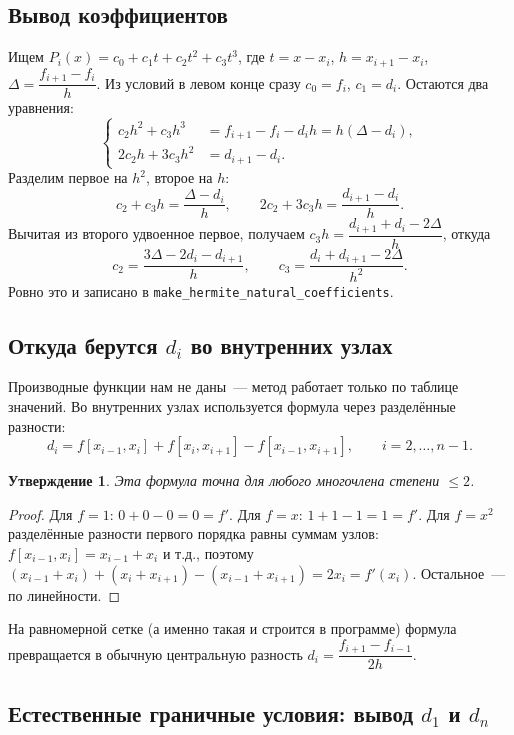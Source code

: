 \documentclass[11pt,a4paper]{report}
\newtheorem{utv}{Утверждение}[chapter]
\begin{document}
\subsection{Вывод коэффициентов}

Ищем $P_i(x)=c_0+c_1t+c_2t^2+c_3t^3$, где $t=x-x_i$, $h=x_{i+1}-x_i$,
$\Delta=\dfrac{f_{i+1}-f_i}{h}$. Из условий в левом конце сразу
$c_0=f_i$, $c_1=d_i$. Остаются два уравнения:
\[
\left\{
\begin{aligned}
c_2h^2+c_3h^3 &= f_{i+1}-f_i-d_ih = h(\Delta-d_i),\\
2c_2h+3c_3h^2 &= d_{i+1}-d_i .
\end{aligned}\right.
\]
Разделим первое на $h^2$, второе на $h$:
\[
c_2+c_3h=\frac{\Delta-d_i}{h},\qquad 2c_2+3c_3h=\frac{d_{i+1}-d_i}{h}.
\]
Вычитая из второго удвоенное первое, получаем $c_3h=\dfrac{d_{i+1}+d_i-2\Delta}{h}$,
откуда
\[
\boxed{\;c_2=\frac{3\Delta-2d_i-d_{i+1}}{h},\qquad
c_3=\frac{d_i+d_{i+1}-2\Delta}{h^2}.\;}
\]
Ровно это и записано в \texttt{make\_hermite\_natural\_coefficients}.

\subsection{Откуда берутся $d_i$ во внутренних узлах}

Производные функции нам не даны~--- метод работает только по таблице значений.
Во внутренних узлах используется формула через разделённые разности:
\[
d_i=f[x_{i-1},x_i]+f[x_i,x_{i+1}]-f[x_{i-1},x_{i+1}],\qquad i=2,\dots,n-1 .
\]
\begin{utv}
Эта формула точна для любого многочлена степени $\le 2$.
\end{utv}
\begin{proof}
Для $f=1$: $0+0-0=0=f'$. Для $f=x$: $1+1-1=1=f'$. Для $f=x^2$ разделённые
разности первого порядка равны суммам узлов:
$f[x_{i-1},x_i]=x_{i-1}+x_i$ и т.д., поэтому
$(x_{i-1}+x_i)+(x_i+x_{i+1})-(x_{i-1}+x_{i+1})=2x_i=f'(x_i)$.
Остальное~--- по линейности.
\end{proof}
На равномерной сетке (а именно такая и строится в программе) формула
превращается в обычную центральную разность
$d_i=\dfrac{f_{i+1}-f_{i-1}}{2h}$.

\subsection{Естественные граничные условия: вывод $d_1$ и $d_n$}
\end{document}
